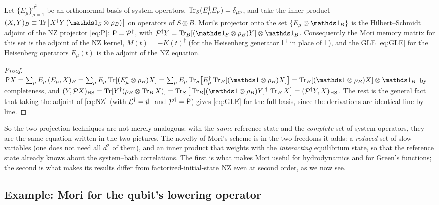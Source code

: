 \begin{proposition}\label{prop:mori-nz}
Let $\{E_\mu\}_{\mu=1}^{d^2}$ be an orthonormal basis of system operators, $\operatorname{Tr}_S(E_\mu^\dagger E_\nu)=\delta_{\mu\nu}$, and take the inner product $(X,Y)_B\equiv\Tr\big[X^\dagger Y\,(\Id_S\otimes\rhoB)\big]$ on operators of $S\otimes B$.
Mori's projector onto the set $\{E_\mu\otimes\Id_B\}$ is the Hilbert--Schmidt adjoint of the NZ projector \eqref{eq:P}: $\mathsf P=\mathcal{P}^\dagger$, with $\Pc^\dagger Y=\Tr_B[(\Id_S\otimes\rhoB)Y]\otimes\Id_B$.
Consequently the Mori memory matrix for this set is the adjoint of the NZ kernel, $M(t)=-K(t)^\dagger$ (for the Heisenberg generator $\mathsf L^\dagger$ in place of $\mathsf L$), and the GLE \eqref{eq:GLE} for the Heisenberg operators $E_\mu(t)$ is the adjoint of the NZ equation.
\end{proposition}
\begin{proof}
$\mathsf PX=\sum_\mu E_\mu\,(E_\mu,X)_B=\sum_\mu E_\mu\Tr[(E_\mu^\dagger\otimes\rhoB)X] =\sum_\mu E_\mu\Tr_S\!\big[E_\mu^\dagger\Tr_B[(\Id\otimes\rhoB)X]\big]=\Tr_B[(\Id\otimes\rhoB)X]\otimes\Id_B$ by completeness, and $(Y,\Pc X)_{\rm HS}=\Tr[Y^\dagger(\rhoB\otimes\Tr_BX)]=\Tr_S\big[\Tr_B[(\Id\otimes\rhoB)Y]^\dagger\,\Tr_BX\big]=(\Pc^\dagger Y,X)_{\rm HS}$.
The rest is the general fact that taking the adjoint of \cref{eq:NZ} (with $\mathcal{L}^\dagger=i\mathsf L$ and $\mathcal{P}^\dagger=\mathsf P$) gives \cref{eq:GLE} for the full basis, since the derivations are identical line by line.
\end{proof}

So the two projection techniques are not merely analogous: with the \emph{same} reference state and the \emph{complete} set of system operators, they are the same equation written in the two pictures.
The novelty of Mori's scheme is in the two freedoms it adds: a \emph{reduced} set of slow variables (one does not need all $d^2$ of them), and an inner product that weights with the \emph{interacting} equilibrium state, so that the reference state already knows about the system--bath correlations.
The first is what makes Mori useful for hydrodynamics and for Green's functions; the second is what makes its results differ from factorized-initial-state NZ even at second order, as we now see.

\subsection{Example: Mori for the qubit's lowering operator}


